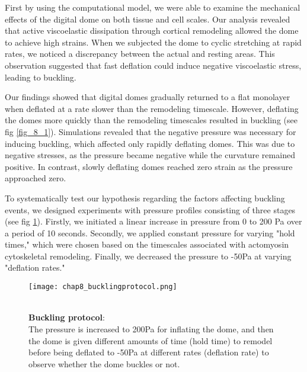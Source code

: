 First by using the computational model, we were able to examine the mechanical effects of the digital dome on both tissue and cell scales. Our analysis revealed that active viscoelastic dissipation through cortical remodeling allowed the dome to achieve high strains. When we subjected the dome to cyclic stretching at rapid rates, we noticed a discrepancy between the actual and resting areas. This observation suggested that fast deflation could induce negative viscoelastic stress, leading to buckling. 

Our findings showed that digital domes gradually returned to a flat monolayer when deflated at a rate slower than the remodeling timescale. However, deflating the domes more quickly than the remodeling timescales resulted in buckling (see fig \ref{fig_8_1}). Simulations revealed that the negative pressure was necessary for inducing buckling, which affected only rapidly deflating domes. This was due to negative stresses, as the pressure became negative while the curvature remained positive. In contrast, slowly deflating domes reached zero strain as the pressure approached zero.

To systematically test our hypothesis regarding the factors affecting buckling events, we designed experiments with pressure profiles consisting of three stages (see fig \ref{fig_8_2}). Firstly, we initiated a linear increase in pressure from 0 to 200 Pa over a period of 10 seconds. Secondly, we applied constant pressure for varying "hold times," which were chosen based on the timescales associated with actomyosin cytoskeletal remodeling. Finally, we decreased the pressure to -50Pa at varying "deflation rates."

\begin{figure}
	\begin{minipage}[c]{0.6\textwidth}
		\texttt{[image: chap8\_bucklingprotocol.png]}
	\end{minipage}\hfill
	\begin{minipage}[c]{0.35\textwidth}
		\caption{\\ \textbf{Buckling protocol}:\\ The pressure is increased to 200Pa for inflating the dome, and then the dome is given different amounts of time (hold time) to remodel before being deflated to -50Pa at different rates (deflation rate) to observe whether the dome buckles or not.	} \label{fig_8_2}
	\end{minipage}
\end{figure}

